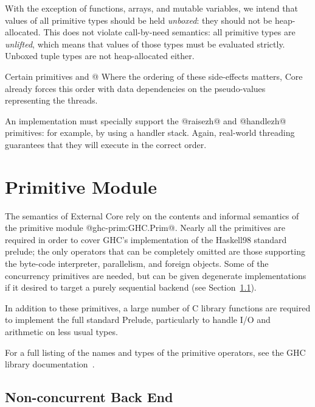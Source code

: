 \documentclass[10pt]{article}
\begin{document}
With the exception of functions, arrays, and mutable variables, we intend that values of all primitive types
should be held {\it unboxed}: they should not be heap-allocated. This does not violate call-by-need semantics: all
primitive types are {\it unlifted}, which means that values of those types must be evaluated strictly.  Unboxed tuple types are not heap-allocated either.

Certain primitives and @%
Where the ordering of these side-effects matters, Core already forces this order with data dependencies on the pseudo-values representing the threads.

An implementation must specially support the @raisezh@ and @handlezh@ primitives: for example, by using a handler stack.  
Again, real-world threading guarantees that they will execute in the correct order.

\section{Primitive Module}
\label{sec:prims}

The semantics of External Core rely on the contents and informal semantics of the primitive module @ghc-prim:GHC.Prim@.
Nearly all the primitives are required in order to cover GHC's implementation of the Haskell98
standard prelude; the only operators that can be completely omitted are those supporting the byte-code interpreter, 
parallelism, and foreign objects.  Some of the concurrency primitives are needed, but can be
given degenerate implementations if it desired to target a purely sequential backend (see Section~\ref{sec:sequential}).

In addition to these primitives, a large number of C library functions are required to implement
the full standard Prelude, particularly to handle I/O and arithmetic on less usual types.

For a full listing of the names and types of the primitive operators, see the GHC library documentation~\citep{ghcprim}.


\subsection{Non-concurrent Back End}
\label{sec:sequential}
\end{document}
